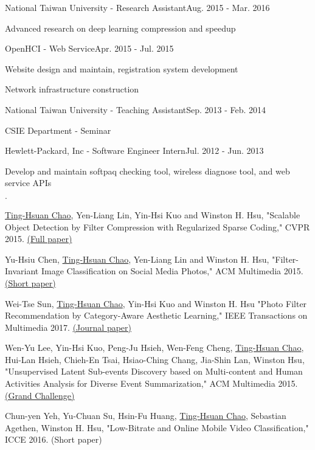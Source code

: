 \documentclass{joel_cv}
\begin{document}
\begin{profExp}{National Taiwan University - Research Assistant}{Aug. 2015 - Mar. 2016}
	\item Advanced research on deep learning compression and speedup
\end{profExp}

\begin{profExp}{OpenHCI - Web Service}{Apr. 2015 - Jul. 2015}
	\item Website design and maintain, registration system development
	\item Network infrastructure construction
\end{profExp}

\begin{profExp}{National Taiwan University - Teaching Assistant}{Sep. 2013 - Feb. 2014}
	\item CSIE Department - Seminar
\end{profExp}

\begin{profExp}{Hewlett-Packard, Inc - Software Engineer Intern}{Jul. 2012 - Jun. 2013}
	\item Develop and maintain softpaq checking tool, wireless diagnose tool, and web service APIs
\end{profExp}

%
%

\begin{sectionItemize}{$\cdot$}
	\item \underline{Ting-Hsuan Chao}, Yen-Liang Lin, Yin-Hsi Kuo and Winston H. Hsu, "Scalable Object Detection by Filter Compression with Regularized Sparse Coding," CVPR 2015. \href{http://www.cv-foundation.org/openaccess/content_cvpr_2015/html/Chao_Scalable_Object_Detection_2015_CVPR_paper.html}{(Full paper)}
	
	\item Yu-Hsiu Chen, \underline{Ting-Hsuan Chao}, Yen-Liang Lin and Winston H. Hsu, "Filter-Invariant Image Classification on Social Media Photos," ACM Multimedia 2015. \href{http://dl.acm.org/citation.cfm?id=2806348}{(Short paper)}
	
	\item Wei-Tse Sun, \underline{Ting-Hsuan Chao}, Yin-Hsi Kuo and Winston H. Hsu "Photo Filter Recommendation by Category-Aware Aesthetic Learning," IEEE Transactions on Multimedia 2017. \href{http://joelthchao.github.io/pdf/photo_sun_tmm_2017.pdf}{(Journal paper)}
	
	\item Wen-Yu Lee, Yin-Hsi Kuo, Peng-Ju Hsieh, Wen-Feng Cheng, \underline{Ting-Hsuan Chao}, Hui-Lan Hsieh, Chieh-En Tsai, Hsiao-Ching Chang, Jia-Shin Lan, Winston Hsu, "Unsupervised Latent Sub-events Discovery based on Multi-content and Human Activities Analysis for Diverse Event Summarization,"  ACM Multimedia 2015. \href{http://dl.acm.org/citation.cfm?id=2809935}{(Grand Challenge)}
	
	\item Chun-yen Yeh, Yu-Chuan Su, Hsin-Fu Huang, \underline{Ting-Hsuan Chao}, Sebastian Agethen, Winston H. Hsu, "Low-Bitrate and Online Mobile Video Classification," ICCE 2016. (Short paper)
\end{sectionItemize}
\end{document}
